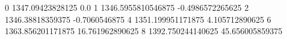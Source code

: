 0 1347.09423828125 0.0
1 1346.5955810546875 -0.4986572265625
2 1346.38818359375 -0.7060546875
4 1351.199951171875 4.105712890625
6 1363.856201171875 16.761962890625
8 1392.750244140625 45.656005859375
